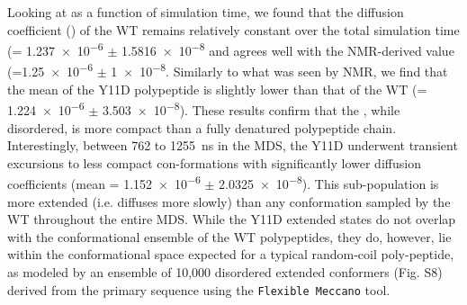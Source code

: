 Looking at \diffusion as a function of simulation time, we found that the diffusion coefficient (\diffusion) of the WT \gct remains relatively constant over the total simulation time (\diffusion = \num{1.237e-6} $\pm$ \SI{1.5816e-8}{\dcunits} and agrees well with the NMR-derived value (\diffusion=\num{1.25e-6} $\pm$  \SI{1e-8}{\dcunits}.  Similarly to what was seen by NMR, we find that the mean \diffusion of the Y11D \gct polypeptide is slightly lower than that of the WT \gct (\diffusion= \num{1.224e-6} $\pm$ \SI{3.503e-8}{\dcunits}). These results confirm that the \gct, while disordered, is more compact than a fully denatured polypeptide chain. Interestingly, between \num{762} to \SI{1255}{\ns} in the MDS, the Y11D \gct underwent transient excursions to less compact con-formations with significantly lower diffusion coefficients (mean \diffusion= \num{1.152e-6} $\pm$ \SI{2.0325e-8}{\dcunits}). This sub-population is more extended (i.e. diffuses more slowly) than any conformation sampled by the WT \gct throughout the entire MDS. While the Y11D \gct extended states do not overlap with the conformational ensemble of the WT \gct polypeptides, they do, however, lie within the conformational space expected for a typical random-coil poly-peptide, as modeled by an ensemble of 10,000 disordered extended conformers (Fig. S8) derived from the \gct primary sequence using the \texttt{Flexible Meccano} tool. 

